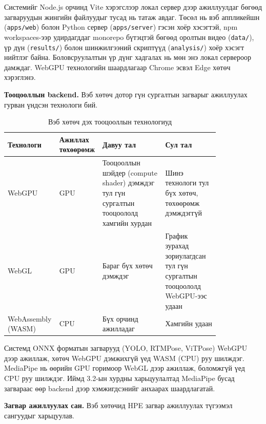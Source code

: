 Системийг Node.js орчинд Vite хэрэгслээр локал сервер дээр ажиллуулдаг бөгөөд загваруудын жингийн файлуудыг тусад нь татаж авдаг. Төсөл нь вэб аппликейшн (\texttt{apps/web}) болон Python сервер (\texttt{apps/server}) гэсэн хоёр хэсэгтэй, npm workspaces-ээр удирдагддаг monorepo бүтэцтэй бөгөөд оролтын видео (\texttt{data/}), үр дүн (\texttt{results/}) болон шинжилгээний скриптүүд (\texttt{analysis/}) хоёр хэсэгт нийтлэг байна. Боловсруулалтын үр дүнг хадгалах нь мөн энэ локал сервероор дамждаг. WebGPU технологийн шаардлагаар Chrome эсвэл Edge хөтөч хэрэглэнэ.

\textbf{Тооцооллын backend.} Вэб хөтөч дотор гүн сургалтын загварыг ажиллуулах гурван үндсэн технологи бий.

\begin{table}[H]
\centering
\caption{Вэб хөтөч дэх тооцооллын технологиуд}
\label{tab:backends}
\small
\begin{tabular}{|>{\raggedright\arraybackslash}p{0.148\linewidth}|>{\raggedright\arraybackslash}p{0.123\linewidth}|>{\raggedright\arraybackslash}p{0.295\linewidth}|>{\raggedright\arraybackslash}p{0.254\linewidth}|}
\hline
\textbf{Технологи} & \textbf{Ажиллах төхөөрөмж} & \textbf{Давуу тал} & \textbf{Сул тал} \\ \hline
WebGPU & GPU & Тооцооллын шэйдер (compute shader) дэмждэг тул гүн сургалтын тооцоололд хамгийн хурдан & Шинэ технологи тул бүх хөтөч, төхөөрөмж дэмждэггүй \\ \hline
WebGL & GPU & Бараг бүх хөтөч дэмждэг & График зурахад зориулагдсан тул гүн сургалтын тооцоололд WebGPU-ээс удаан \\ \hline
WebAssembly (WASM) & CPU & Бүх орчинд ажилладаг & Хамгийн удаан \\ \hline
\end{tabular}
\end{table}

Системд ONNX форматын загварууд (YOLO, RTMPose, ViTPose) WebGPU дээр ажиллаж, хөтөч WebGPU дэмжихгүй үед WASM (CPU) руу шилждэг. MediaPipe нь өөрийн GPU горимоор WebGL дээр ажиллаж, боломжгүй үед CPU руу шилждэг. Иймд 3.2-ын хурдны харьцуулалтад MediaPipe бусад загвараас өөр backend дээр хэмжигдсэнийг анхаарах шаардлагатай.

\textbf{Загвар ажиллуулах сан.} Вэб хөтөчид HPE загвар ажиллуулах түгээмэл сангуудыг харьцуулав.

